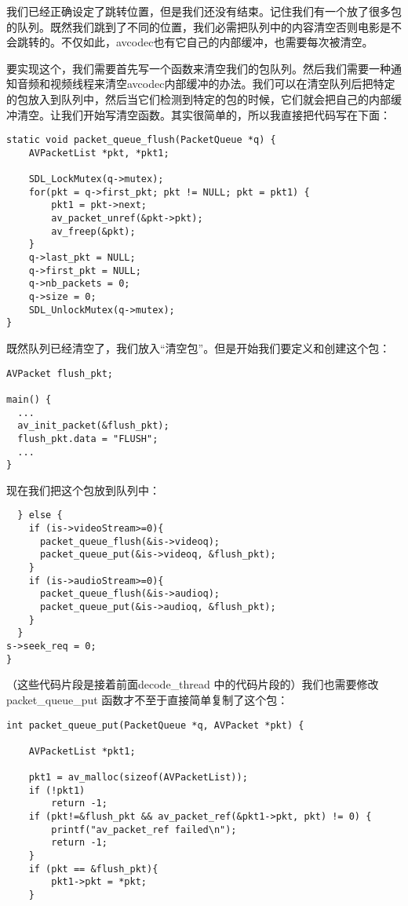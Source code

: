 我们已经正确设定了跳转位置，但是我们还没有结束。记住我们有一个放了很多包的队列。既然我们跳到了不同的位置，我们必需把队列中的内容清空否则电影是不会跳转的。不仅如此，avcodec也有它自己的内部缓冲，也需要每次被清空。

要实现这个，我们需要首先写一个函数来清空我们的包队列。然后我们需要一种通知音频和视频线程来清空avcodec内部缓冲的办法。我们可以在清空队列后把特定的包放入到队列中，然后当它们检测到特定的包的时候，它们就会把自己的内部缓冲清空。让我们开始写清空函数。其实很简单的，所以我直接把代码写在下面：
\begin{lstlisting}
static void packet_queue_flush(PacketQueue *q) {
    AVPacketList *pkt, *pkt1;

    SDL_LockMutex(q->mutex);
    for(pkt = q->first_pkt; pkt != NULL; pkt = pkt1) {
        pkt1 = pkt->next;
        av_packet_unref(&pkt->pkt);
        av_freep(&pkt);
    }
    q->last_pkt = NULL;
    q->first_pkt = NULL;
    q->nb_packets = 0;
    q->size = 0;
    SDL_UnlockMutex(q->mutex);
}
\end{lstlisting}

既然队列已经清空了，我们放入“清空包”。但是开始我们要定义和创建这个包：

\begin{lstlisting}
AVPacket flush_pkt;

main() {
  ...
  av_init_packet(&flush_pkt);
  flush_pkt.data = "FLUSH";
  ...
}
\end{lstlisting}

现在我们把这个包放到队列中：

\begin{lstlisting}
  } else {
    if (is->videoStream>=0){
      packet_queue_flush(&is->videoq);
      packet_queue_put(&is->videoq, &flush_pkt);
    }
    if (is->audioStream>=0){
      packet_queue_flush(&is->audioq);
      packet_queue_put(&is->audioq, &flush_pkt);
    }
  }
s->seek_req = 0;
}
\end{lstlisting}

（这些代码片段是接着前面decode_thread 中的代码片段的）我们也需要修改packet_queue_put 函数才不至于直接简单复制了这个包：

\begin{lstlisting}
int packet_queue_put(PacketQueue *q, AVPacket *pkt) {

    AVPacketList *pkt1;

    pkt1 = av_malloc(sizeof(AVPacketList));
    if (!pkt1)
        return -1;
    if (pkt!=&flush_pkt && av_packet_ref(&pkt1->pkt, pkt) != 0) {
        printf("av_packet_ref failed\n");
        return -1;
    }
    if (pkt == &flush_pkt){
        pkt1->pkt = *pkt;
    }
\end{lstlisting}

